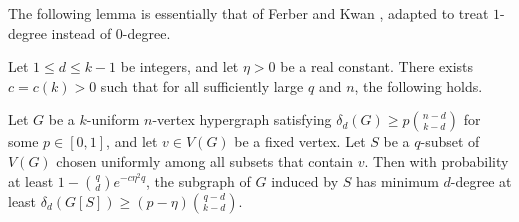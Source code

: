 \documentclass[11pt]{article}
\begin{document}
The following lemma is essentially that of Ferber and Kwan \cite{ferber2023counting}, adapted to treat $1$-degree instead of $0$-degree.

\begin{lemma}\label{le-rooted}
    Let $1\le d\le k-1$ be integers, and let $\eta>0$ be a real constant. There exists $c=c(k)>0$ such that for all sufficiently large $q$ and $n$, the following holds.

    Let $G$ be a $k$-uniform $n$-vertex hypergraph satisfying $\delta_d(G)\ge p\binom{n-d}{k-d}$ for some $p\in[0,1]$, and let $v\in V(G)$ be a fixed vertex. Let $S$ be a $q$-subset of $V(G)$ chosen uniformly among all subsets that contain $v$. Then with probability at least $1-\binom{q}{d}e^{-c\eta^2 q}$, the subgraph of $G$ induced by $S$ has minimum $d$-degree at least $\delta_d(G[S])\ge(p-\eta)\binom{q-d}{k-d}$.
\end{lemma}
\end{document}
